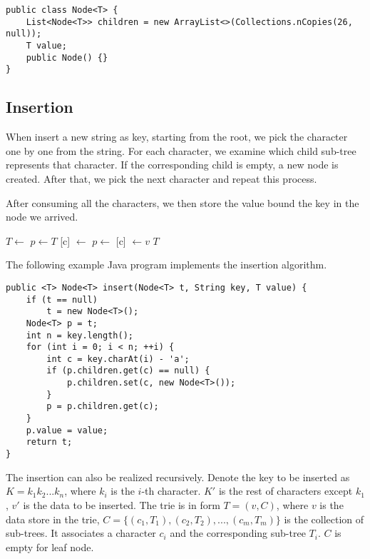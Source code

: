 \documentclass{article}
\begin{document}
\lstset{language=Java}
\begin{lstlisting}
public class Node<T> {
    List<Node<T>> children = new ArrayList<>(Collections.nCopies(26, null));
    T value;
    public Node() {}
}
\end{lstlisting}


\subsection{Insertion}

When insert a new string as key, starting from the root, we pick the character
one by one from the string. For each character, we examine which child sub-tree
represents that character. If the corresponding child is empty, a new node is
created. After that, we pick the next character and repeat this process.

After consuming all the characters, we then store the
value bound the key in the node we arrived.

\begin{algorithmic}[1]
    \State $T \gets $ 
  \EndIf
  \State $p \gets T$
      \State {}[c] $\gets$ 
    \EndIf
    \State $p \gets $ [c]
  \EndFor
  \State {} $\gets v$
  \State \Return $T$
\EndFunction
\end{algorithmic}

The following example Java program implements the insertion algorithm.

\lstset{language=Java}
\begin{lstlisting}
public <T> Node<T> insert(Node<T> t, String key, T value) {
    if (t == null)
        t = new Node<T>();
    Node<T> p = t;
    int n = key.length();
    for (int i = 0; i < n; ++i) {
        int c = key.charAt(i) - 'a';
        if (p.children.get(c) == null) {
            p.children.set(c, new Node<T>());
        }
        p = p.children.get(c);
    }
    p.value = value;
    return t;
}
\end{lstlisting}

The insertion can also be realized recursively. Denote the
key to be inserted as $K = k_1k_2...k_n$, where $k_i$ is the $i$-th
character. $K'$ is the rest of characters except $k_1$, $v'$ is the
data to be inserted.
The trie is in form $T = (v, C)$, where $v$ is the
data store in the trie, $C = \{(c_1, T_1), (c_2, T_2), ..., (c_m, T_m)\}$ is the
collection of sub-trees. It associates a character $c_i$ and the corresponding
sub-tree $T_i$. $C$ is empty for leaf node.
\end{document}

